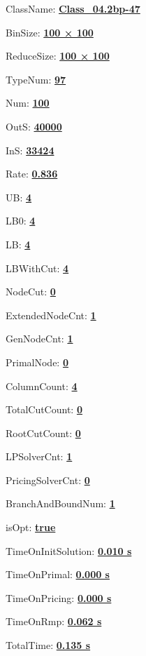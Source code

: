 \documentclass[11pt]{article}
\begin{document}
\pagestyle{empty}


ClassName: \underline{\textbf{Class_04.2bp-47}}
\par
BinSize: \underline{\textbf{100 × 100}}
\par
ReduceSize: \underline{\textbf{100 × 100}}
\par
TypeNum: \underline{\textbf{97}}
\par
Num: \underline{\textbf{100}}
\par
OutS: \underline{\textbf{40000}}
\par
InS: \underline{\textbf{33424}}
\par
Rate: \underline{\textbf{0.836}}
\par
UB: \underline{\textbf{4}}
\par
LB0: \underline{\textbf{4}}
\par
LB: \underline{\textbf{4}}
\par
LBWithCut: \underline{\textbf{4}}
\par
NodeCut: \underline{\textbf{0}}
\par
ExtendedNodeCnt: \underline{\textbf{1}}
\par
GenNodeCnt: \underline{\textbf{1}}
\par
PrimalNode: \underline{\textbf{0}}
\par
ColumnCount: \underline{\textbf{4}}
\par
TotalCutCount: \underline{\textbf{0}}
\par
RootCutCount: \underline{\textbf{0}}
\par
LPSolverCnt: \underline{\textbf{1}}
\par
PricingSolverCnt: \underline{\textbf{0}}
\par
BranchAndBoundNum: \underline{\textbf{1}}
\par
isOpt: \underline{\textbf{true}}
\par
TimeOnInitSolution: \underline{\textbf{0.010 s}}
\par
TimeOnPrimal: \underline{\textbf{0.000 s}}
\par
TimeOnPricing: \underline{\textbf{0.000 s}}
\par
TimeOnRmp: \underline{\textbf{0.062 s}}
\par
TotalTime: \underline{\textbf{0.135 s}}
\par
\newpage
\end{document}
